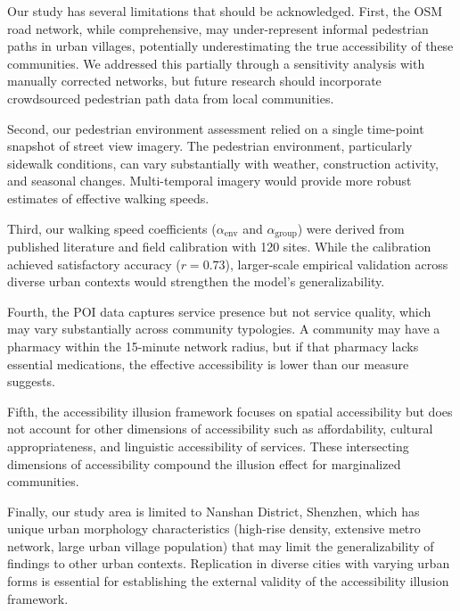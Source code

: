 \documentclass[10pt,conference,compsoc]{IEEEtran}
\begin{document}
\begin{table}[htbp]
\begin{center}
Our study has several limitations that should be acknowledged. First, the OSM road network, while comprehensive, may under-represent informal pedestrian paths in urban villages, potentially underestimating the true accessibility of these communities. We addressed this partially through a sensitivity analysis with manually corrected networks, but future research should incorporate crowdsourced pedestrian path data from local communities.

Second, our pedestrian environment assessment relied on a single time-point snapshot of street view imagery. The pedestrian environment, particularly sidewalk conditions, can vary substantially with weather, construction activity, and seasonal changes. Multi-temporal imagery would provide more robust estimates of effective walking speeds.

Third, our walking speed coefficients ($\alpha_{\text{env}}$ and $\alpha_{\text{group}}$) were derived from published literature and field calibration with 120 sites. While the calibration achieved satisfactory accuracy ($r = 0.73$), larger-scale empirical validation across diverse urban contexts would strengthen the model's generalizability.

Fourth, the POI data captures service presence but not service quality, which may vary substantially across community typologies. A community may have a pharmacy within the 15-minute network radius, but if that pharmacy lacks essential medications, the effective accessibility is lower than our measure suggests.

Fifth, the accessibility illusion framework focuses on spatial accessibility but does not account for other dimensions of accessibility such as affordability, cultural appropriateness, and linguistic accessibility of services. These intersecting dimensions of accessibility compound the illusion effect for marginalized communities.

Finally, our study area is limited to Nanshan District, Shenzhen, which has unique urban morphology characteristics (high-rise density, extensive metro network, large urban village population) that may limit the generalizability of findings to other urban contexts. Replication in diverse cities with varying urban forms is essential for establishing the external validity of the accessibility illusion framework.


\end{center}
\end{table}
\end{document}
